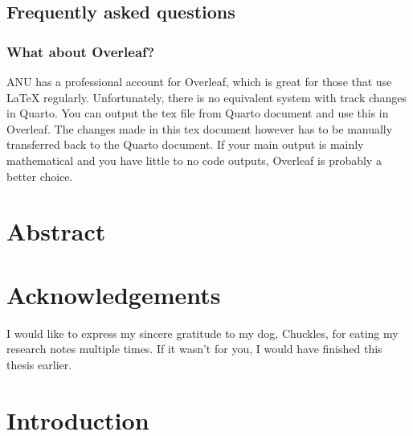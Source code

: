 \documentclass[
  a4paper,
  oneside,
  openany,
  12pt,
  onecolumn]{book}
\theoremstyle{definition}
\theoremstyle{plain}
\theoremstyle{remark}
\begin{document}
\section*{Frequently asked questions}\label{frequently-asked-questions}


\subsection*{What about Overleaf?}\label{what-about-overleaf}

ANU has a professional account for Overleaf, which is great for those
that use LaTeX regularly. Unfortunately, there is no equivalent system
with track changes in Quarto. You can output the tex file from Quarto
document and use this in Overleaf. The changes made in this tex document
however has to be manually transferred back to the Quarto document. If
your main output is mainly mathematical and you have little to no code
outputs, Overleaf is probably a better choice.


\chapter*{Abstract}\label{abstract}



\chapter*{Acknowledgements}\label{acknowledgements}


I would like to express my sincere gratitude to my dog, Chuckles, for
eating my research notes multiple times. If it wasn't for you, I would
have finished this thesis earlier.


\chapter{Introduction}\label{sec-intro}
\end{document}
